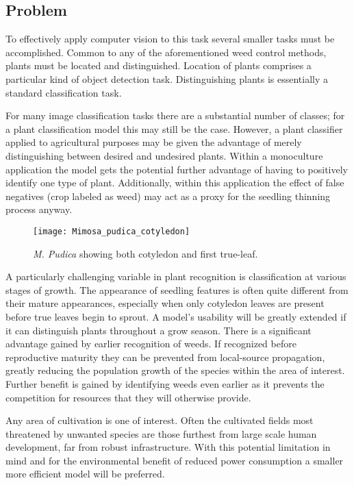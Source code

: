 \documentclass[]{article}
\begin{document}
\subsection{Problem}

To effectively apply computer vision to this task several smaller tasks must be accomplished. Common to any of the aforementioned weed control methods, plants must be located and distinguished. Location of plants comprises a particular kind of object detection task. Distinguishing plants is essentially a standard classification task. 

For many image classification tasks there are a substantial number of classes; for a plant classification model this may still be the case. However, a plant classifier applied to agricultural purposes may be given the advantage of merely distinguishing between desired and undesired plants. Within a monoculture application the model gets the potential further advantage of having to positively identify one type of plant. Additionally, within this application the effect of false negatives (crop labeled as weed) may act as a proxy for the seedling thinning process anyway.

\begin{wrapfigure}{l}{0.5\textwidth}
	\begin{center}
		\texttt{[image: Mimosa\_pudica\_cotyledon]}
	\end{center}
	\caption{\emph{M. Pudica} showing both cotyledon and first true-leaf.\cite{MPudicaPic}}
\end{wrapfigure}
A particularly challenging variable in plant recognition is classification at various stages of growth. 
The appearance of seedling features is often quite different from their mature appearances, especially when only cotyledon leaves are present before true leaves begin to sprout.
A model's usability will be greatly extended if it can distinguish plants throughout a grow season.
There is a significant advantage gained by earlier recognition of weeds.
If recognized before reproductive maturity they can be prevented from local-source propagation, greatly reducing the population growth of the species within the area of interest.
Further benefit is gained by identifying weeds even earlier as it prevents the competition for resources that they will otherwise provide.

Any area of cultivation is one of interest. 
Often the cultivated fields most threatened by unwanted species are those furthest from large scale human development, far from robust infrastructure. 
With this potential limitation in mind and for the environmental benefit of reduced power consumption a smaller more efficient model will be preferred. 
\end{document}
